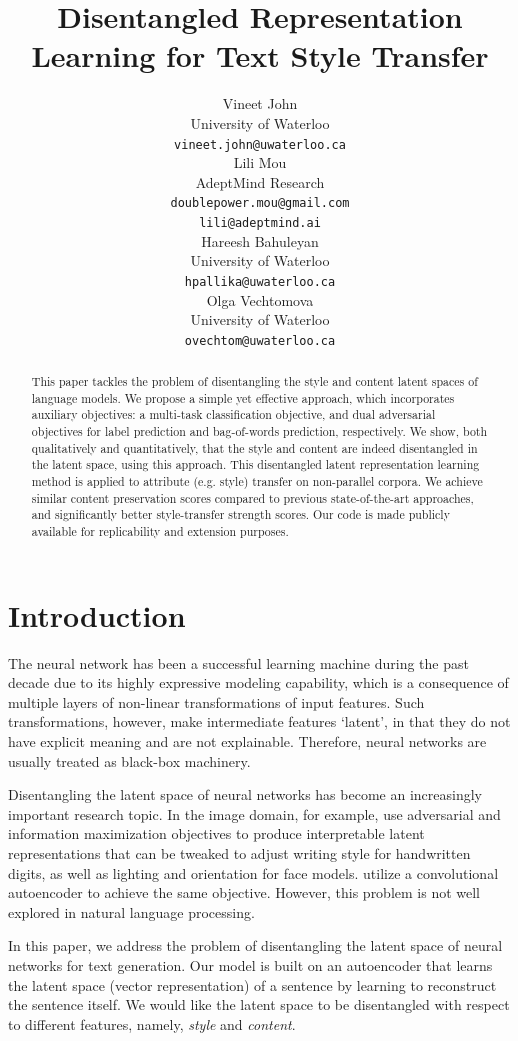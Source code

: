 \documentclass[11pt,a4paper]{article}
\title{Disentangled Representation Learning for Text Style Transfer}
\author{
	Vineet John \\
	University of Waterloo \\
	{\tt vineet.john@uwaterloo.ca} \\
	\And
	Lili Mou \\
	AdeptMind Research \\
	{\tt doublepower.mou@gmail.com}\\{\tt lili@adeptmind.ai} \\
	\AND
	Hareesh Bahuleyan \\
	University of Waterloo \\
	{\tt hpallika@uwaterloo.ca} \\
	\And
	Olga Vechtomova \\
	University of Waterloo \\
	{\tt ovechtom@uwaterloo.ca} \\
}
\date{}
\begin{document}
\maketitle
\graphicspath{{images/}}

\begin{abstract}
	This paper tackles the problem of disentangling the style and content latent spaces of language models. We propose a simple yet effective approach, which incorporates auxiliary objectives: a multi-task classification objective, and dual adversarial objectives for label prediction and bag-of-words prediction, respectively. We show, both qualitatively and quantitatively, that the style and content are indeed disentangled in the latent space, using this approach. This disentangled latent representation learning method is applied to attribute (e.g. style) transfer on non-parallel corpora. We achieve similar content preservation scores compared to previous state-of-the-art approaches, and significantly better style-transfer strength scores. Our code is made publicly available for replicability and extension purposes.
\end{abstract}

% 


\section{Introduction}

The neural network has been a successful learning machine during the past decade due to its highly expressive modeling capability, which is a consequence of multiple layers of non-linear transformations of input features. Such transformations, however, make intermediate features `latent', in that they do not have explicit meaning and are not explainable. Therefore, neural networks are usually treated as black-box machinery.

Disentangling the latent space of neural networks has become an increasingly important research topic. In the image domain, for example, \citet{chen2016infogan} use adversarial and information maximization objectives to produce interpretable latent representations that can be tweaked to adjust writing style for handwritten digits, as well as lighting and orientation for face models. \citet{mathieu2016disentangling} utilize a convolutional autoencoder to achieve the same objective. However, this problem is not well explored in natural language processing.

In this paper, we address the problem of disentangling the latent space of neural networks for text generation. Our model is built on an autoencoder that learns the latent space (vector representation) of a sentence by learning to reconstruct the sentence itself. We would like the latent space to be disentangled with respect to different features, namely, \textit{style} and \textit{content}.
\end{document}
